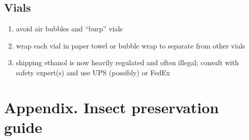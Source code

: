 \documentclass[letterpaper, 11pt]{article}
\begin{document}
\subsection*{Vials}
\begin{enumerate}
\item avoid air bubbles and “burp” vials
\item wrap each vial in paper towel or bubble wrap to separate from other vials
\item shipping ethanol is now heavily regulated and often illegal; consult with safety expert(s) and use UPS (possibly) or FedEx
\end{enumerate}

\clearpage
\section*{Appendix. Insect preservation guide}
\end{document}
